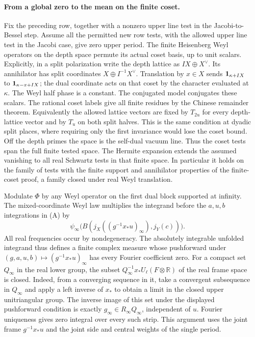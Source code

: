 \paragraph{From a global zero to the mean on the finite coset.}
Fix the preceding row, together with a nonzero upper line
test in the Jacobi-to-Bessel step. Assume all the permitted
new row tests, with the allowed upper line test in the Jacobi
case, give zero upper period. The finite Heisenberg Weyl
operators on the depth space permute its actual coset basis,
up to unit scalars. Explicitly, in a split polarization
write the depth lattice as \(I X\oplus X^\vee\). Its
annihilator has split coordinates \(X\oplus I^{-1}X^\vee\).
Translation by \(x\in X\) sends
\({\bf1}_{\kappa+IX}\) to
\({\bf1}_{\kappa-x+IX}\); the dual coordinate acts on
that coset by the character evaluated at \(\kappa\).
The Weyl half phase is a constant. The conjugated model
conjugates these scalars. The rational coset labels give all
finite residues by the Chinese remainder theorem. Equivalently
the allowed lattice vectors are fixed by \(T_{2u}\) for
every depth-lattice vector and by \(T_u\) on both split
halves. This is the same condition at dyadic split places,
where requiring only the first invariance would lose the
coset bound. Off the depth primes the space is the self-dual
vacuum line. Thus the coset tests span the full finite tested
space. The Hermite expansion extends the assumed vanishing
to all real Schwartz tests in that finite space. In particular
it holds on the family of tests with the finite support and
annihilator properties of the finite-coset proof, a family
closed under real Weyl translation.

Modulate \(\Phi\) by any Weyl operator on the first dual
block supported at infinity. The mixed-coordinate Weyl law
multiplies the integrand before the \(a,u,b\) integrations
in (A) by
\[
 \psi_\infty\bigl(B(j_X((g^{-1}x_*u)_\infty),j_Y(c))\bigr).
 \tag{D}
\]
All real frequencies occur by nondegeneracy. The absolutely
integrable unfolded integrand thus defines a finite complex
measure whose pushforward under
\((g,a,u,b)\mapsto (g^{-1}x_*u)_\infty\) has every Fourier
coefficient zero. For a compact set \(Q_\infty\) in the
real lower group, the subset
\(Q_\infty^{-1}x_*U_\ell(F\otimes\mathbb R)\) of the
real frame space is closed. Indeed, from a converging
sequence in it, take a convergent subsequence in
\(Q_\infty\) and apply a left inverse of \(x_*\) to
obtain a limit in the closed upper unitriangular group.
The inverse image of this set under the displayed pushforward
condition is exactly
\(g_\infty\in R_\infty Q_\infty\), independent of
\(u\). Fourier uniqueness gives zero integral over every
such strip. This argument uses the joint frame \(g^{-1}x_*u\)
and the joint side and central weights of the single period.

